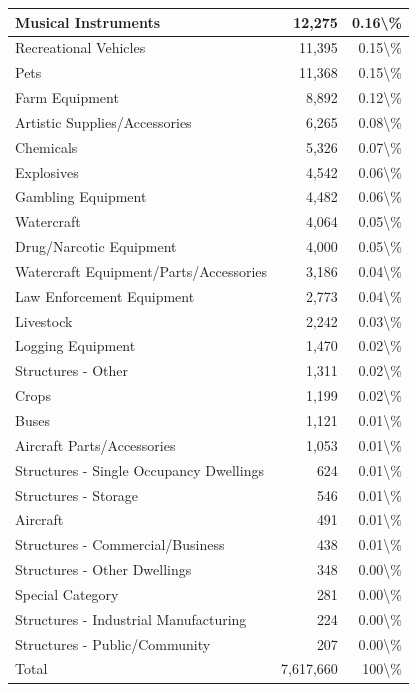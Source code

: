 \documentclass[
]{krantz}
\begin{document}
\begin{longtable}[t]{l|r|r}
\hline
Musical Instruments & 12,275 & 0.16\textbackslash{}\%\\
\hline
Recreational Vehicles & 11,395 & 0.15\textbackslash{}\%\\
\hline
Pets & 11,368 & 0.15\textbackslash{}\%\\
\hline
Farm Equipment & 8,892 & 0.12\textbackslash{}\%\\
\hline
Artistic Supplies/Accessories & 6,265 & 0.08\textbackslash{}\%\\
\hline
Chemicals & 5,326 & 0.07\textbackslash{}\%\\
\hline
Explosives & 4,542 & 0.06\textbackslash{}\%\\
\hline
Gambling Equipment & 4,482 & 0.06\textbackslash{}\%\\
\hline
Watercraft & 4,064 & 0.05\textbackslash{}\%\\
\hline
Drug/Narcotic Equipment & 4,000 & 0.05\textbackslash{}\%\\
\hline
Watercraft Equipment/Parts/Accessories & 3,186 & 0.04\textbackslash{}\%\\
\hline
Law Enforcement Equipment & 2,773 & 0.04\textbackslash{}\%\\
\hline
Livestock & 2,242 & 0.03\textbackslash{}\%\\
\hline
Logging Equipment & 1,470 & 0.02\textbackslash{}\%\\
\hline
Structures - Other & 1,311 & 0.02\textbackslash{}\%\\
\hline
Crops & 1,199 & 0.02\textbackslash{}\%\\
\hline
Buses & 1,121 & 0.01\textbackslash{}\%\\
\hline
Aircraft Parts/Accessories & 1,053 & 0.01\textbackslash{}\%\\
\hline
Structures - Single Occupancy Dwellings & 624 & 0.01\textbackslash{}\%\\
\hline
Structures - Storage & 546 & 0.01\textbackslash{}\%\\
\hline
Aircraft & 491 & 0.01\textbackslash{}\%\\
\hline
Structures - Commercial/Business & 438 & 0.01\textbackslash{}\%\\
\hline
Structures - Other Dwellings & 348 & 0.00\textbackslash{}\%\\
\hline
Special Category & 281 & 0.00\textbackslash{}\%\\
\hline
Structures - Industrial Manufacturing & 224 & 0.00\textbackslash{}\%\\
\hline
Structures - Public/Community & 207 & 0.00\textbackslash{}\%\\
\hline
Total & 7,617,660 & 100\textbackslash{}\%\\
\hline
\end{longtable}
\end{document}
